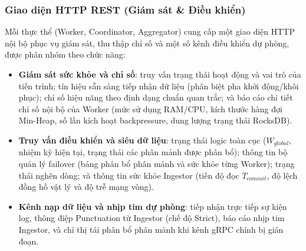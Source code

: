 \documentclass[12pt,a4paper]{article}
\begin{document}
\subsubsection{Giao diện HTTP REST (Giám sát \& Điều khiển)}
Mỗi thực thể (Worker, Coordinator, Aggregator) cung cấp một giao diện HTTP nội bộ phục vụ giám sát, thu thập chỉ số và một số kênh điều khiển dự phòng, được phân nhóm theo chức năng:

\begin{itemize}[leftmargin=*]
    \item \textbf{Giám sát sức khỏe và chỉ số}: truy vấn trạng thái hoạt động và vai trò của tiến trình; tín hiệu sẵn sàng tiếp nhận dữ liệu (phân biệt pha khởi động/khôi phục); chỉ số hiệu năng theo định dạng chuẩn quan trắc; và báo cáo chi tiết chỉ số nội bộ của Worker (mức sử dụng RAM/CPU, kích thước hàng đợi Min-Heap, số lần kích hoạt backpressure, dung lượng trạng thái RocksDB).
    \item \textbf{Truy vấn điều khiển và siêu dữ liệu}: trạng thái logic toàn cục ($W_{global}$, nhiệm kỳ hiện tại, trạng thái các phân mảnh được phân bổ); thông tin bộ quản lý failover (bảng phân bổ phân mảnh và sức khỏe từng Worker); trạng thái nghẽn dòng; và thông tin sức khỏe Ingestor (tiến độ đọc $T_{commit}$, độ lệch đồng hồ vật lý và độ trễ mạng vòng).
    \item \textbf{Kênh nạp dữ liệu và nhịp tim dự phòng}: tiếp nhận trực tiếp sự kiện log, thông điệp Punctuation từ Ingestor (chế độ Strict), báo cáo nhịp tim Ingestor, và chỉ thị tái phân bổ phân mảnh khi kênh gRPC chính bị gián đoạn.
\end{itemize}

\vspace{0.5cm}

\end{document}
